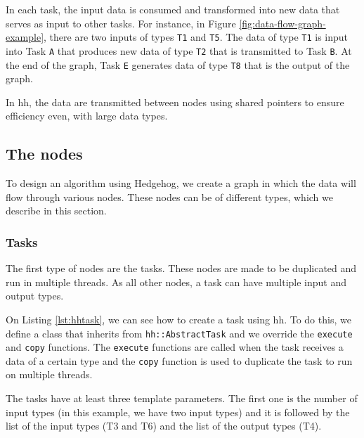 In each task, the input data is consumed and transformed into new data that
serves as input to other tasks. For instance, in Figure
\ref{fig:data-flow-graph-example}, there are two inputs of types \texttt{T1} and
\texttt{T5}. The data of type \texttt{T1} is input into Task \texttt{A} that
produces new data of type \texttt{T2} that is transmitted to Task \texttt{B}.
At the end of the graph, Task \texttt{E} generates data of type \texttt{T8}
that is the output of the graph.

In \gls{hh}, the data are transmitted between nodes using shared pointers to
ensure efficiency even, with large data types.

\subsection{The nodes}

To design an algorithm using Hedgehog, we create a graph in which the data will
flow through various nodes. These nodes can be of different types, which we
describe in this section.

\subsubsection{Tasks}

The first type of nodes are the tasks. These nodes are made to be duplicated and
run in multiple threads. As all other nodes, a task can have multiple input and
output types.

On Listing \ref{lst:hhtask}, we can see how to create a task using \gls{hh}.
To do this, we define a class that inherits from \texttt{hh::AbstractTask} and
we override the \texttt{execute} and \texttt{copy} functions. The
\texttt{execute} functions are called when the task receives a data of a certain
type and the \texttt{copy} function is used to duplicate the task to run on
multiple threads.

The tasks have at least three template parameters. The first one is the number
of input types (in this example, we have two input types) and it is followed by
the list of the input types (T3 and T6) and the list of the output types (T4).

